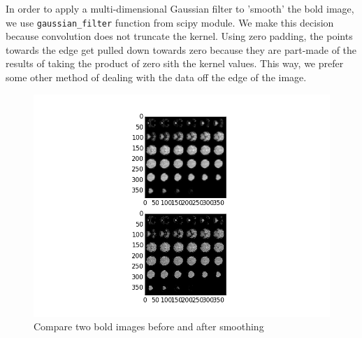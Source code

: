 \par \indent In order to apply a multi-dimensional Gaussian filter to 'smooth'
the bold image, we use \texttt{gaussian_filter} function from scipy module. 
We make this decision because convolution does not truncate the kernel. Using
zero padding, the points towards the edge get pulled down towards zero because
they are part-made of the results of taking the product of zero sith the kernel
values. This way, we prefer some other method of dealing with the data off the
edge of the image. 
\begin{figure}[ht]
\centering
\includegraphics[scale=0.5]{images/smooth_fig}
\caption{Compare two bold images before and after smoothing}
\label{fig:smoothing}
\end{figure}
